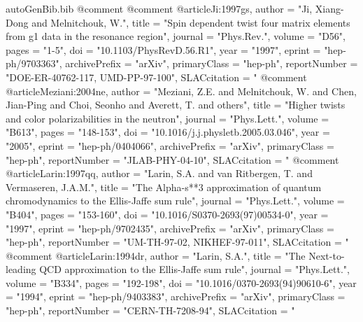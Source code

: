 \begin{filecontents*}{autoGenBib.bib}
@comment %
@comment %
@article{Ji:1997gs,
      author         = "Ji, Xiang-Dong and Melnitchouk, W.",
      title          = "{Spin dependent twist four matrix elements from g1 data
                        in the resonance region}",
      journal        = "Phys.Rev.",
      volume         = "D56",
      pages          = "1-5",
      doi            = "10.1103/PhysRevD.56.R1",
      year           = "1997",
      eprint         = "hep-ph/9703363",
      archivePrefix  = "arXiv",
      primaryClass   = "hep-ph",
      reportNumber   = "DOE-ER-40762-117, UMD-PP-97-100",
      SLACcitation   = "%
}
@comment %
@article{Meziani:2004ne,
      author         = "Meziani, Z.E. and Melnitchouk, W. and Chen, Jian-Ping and
                        Choi, Seonho and Averett, T. and others",
      title          = "{Higher twists and color polarizabilities in the
                        neutron}",
      journal        = "Phys.Lett.",
      volume         = "B613",
      pages          = "148-153",
      doi            = "10.1016/j.j.physletb.2005.03.046",
      year           = "2005",
      eprint         = "hep-ph/0404066",
      archivePrefix  = "arXiv",
      primaryClass   = "hep-ph",
      reportNumber   = "JLAB-PHY-04-10",
      SLACcitation   = "%
}
@comment %
@article{Larin:1997qq,
      author         = "Larin, S.A. and van Ritbergen, T. and Vermaseren, J.A.M.",
      title          = "{The Alpha-s**3 approximation of quantum chromodynamics
                        to the Ellis-Jaffe sum rule}",
      journal        = "Phys.Lett.",
      volume         = "B404",
      pages          = "153-160",
      doi            = "10.1016/S0370-2693(97)00534-0",
      year           = "1997",
      eprint         = "hep-ph/9702435",
      archivePrefix  = "arXiv",
      primaryClass   = "hep-ph",
      reportNumber   = "UM-TH-97-02, NIKHEF-97-011",
      SLACcitation   = "%
}
@comment %
@article{Larin:1994dr,
      author         = "Larin, S.A.",
      title          = "{The Next-to-leading QCD approximation to the Ellis-Jaffe
                        sum rule}",
      journal        = "Phys.Lett.",
      volume         = "B334",
      pages          = "192-198",
      doi            = "10.1016/0370-2693(94)90610-6",
      year           = "1994",
      eprint         = "hep-ph/9403383",
      archivePrefix  = "arXiv",
      primaryClass   = "hep-ph",
      reportNumber   = "CERN-TH-7208-94",
      SLACcitation   = "%
}
\end{filecontents*}

